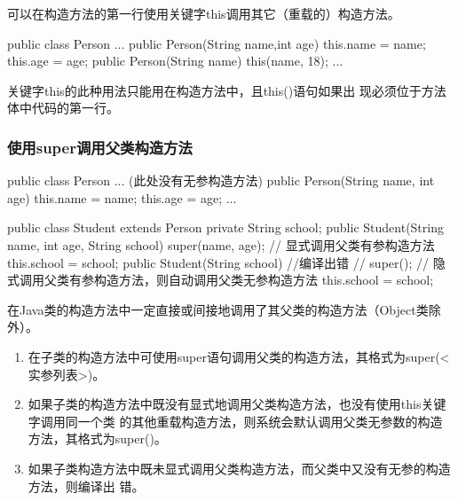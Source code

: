 可以在构造方法的第一行使用关键字this调用其它（重载的）构造方法。

\begin{javaCode}
  public class Person {
    ...
    public Person(String name,int age) {
      this.name = name;
      this.age = age;
    }
    public Person(String name) {
      this(name, 18);
    }
    ...
  }
\end{javaCode}


关键字this的此种用法只能用在构造方法中，且this()语句如果出
现必须位于方法体中代码的第一行。

\subsubsection{使用super调用父类构造方法}


\begin{javaCode}
  public class Person {
    ... (此处没有无参构造方法)
    public Person(String name, int age) {
      this.name = name;
      this.age = age;
    }
    ...
  }  
\end{javaCode}


\begin{javaCode}
  public class Student extends Person {
    private String school;
    public Student(String name, int age, String school) {
      super(name, age); // 显式调用父类有参构造方法
      this.school = school;
    }
    public Student(String school) { //编译出错
      // super(); // 隐式调用父类有参构造方法，则自动调用父类无参构造方法
      this.school = school;
    }
  }
\end{javaCode}


{\Blue\hei 在Java类的构造方法中一定直接或间接地调用了其父类的构造方法（Object类除外）。}

\begin{enumerate}
\item 在子类的构造方法中可使用super语句调用父类的构造方法，其格式为super(<实参列表>)。
\item 如果子类的构造方法中既没有显式地调用父类构造方法，也没有使用this关键字调用同一个类
  的其他重载构造方法，则系统会默认调用父类无参数的构造方法，其格式为super()。
\item 如果子类构造方法中既未显式调用父类构造方法，而父类中又没有无参的构造方法，则编译出
  错。
\end{enumerate}

